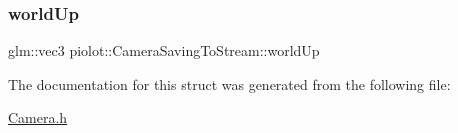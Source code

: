 \mbox{\label{structpiolot_1_1_camera_saving_to_stream_acafc5157ece98eb00acf67acb5b66c88}} 
\subsubsection{\texorpdfstring{world\+Up}{worldUp}}
{\footnotesize\ttfamily glm\+::vec3 piolot\+::\+Camera\+Saving\+To\+Stream\+::world\+Up}



The documentation for this struct was generated from the following file\+:\begin{DoxyCompactItemize}
\item 
\mbox{\hyperlink{_camera_8h}{Camera.\+h}}\end{DoxyCompactItemize}
